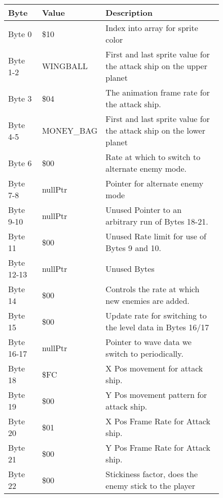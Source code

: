\begin{figure}[H]
{\begin{adjustbox}{width=12cm}
\begin{tabular}{lll}
\toprule
 Byte       & Value             & Description                                                         \\
\midrule
 Byte 0     & \$10               & Index into array for sprite color                                   \\
 Byte 1-2   & WINGBALL          & First and last sprite value for the attack ship on the upper planet \\
 Byte 3     & \$04               & The animation frame rate for the attack ship.                       \\
 Byte 4-5   & MONEY\_BAG         & First and last sprite value for the attack ship on the lower planet \\
 Byte 6     & \$00               & Rate at which to switch to alternate enemy mode.                    \\
 Byte 7-8   & nullPtr           & Pointer for alternate enemy mode                                    \\
 Byte 9-10  & nullPtr           & Unused Pointer to an arbitrary run of Bytes 18-21.                  \\
 Byte 11    & \$00               & Unused Rate limit for use of Bytes 9 and 10.                        \\
 Byte 12-13 & nullPtr           & Unused Bytes                                                        \\
 Byte 14    & \$00               & Controls the rate at which new enemies are added.                   \\
 Byte 15    & \$00               & Update rate for switching to the level data in Bytes 16/17          \\
 Byte 16-17 & nullPtr           & Pointer to wave data we switch to periodically.                     \\
 Byte 18    & \$FC               & X Pos movement for attack ship.                                     \\
 Byte 19    & \$00               & Y Pos movement pattern for attack ship.                             \\
 Byte 20    & \$01               & X Pos Frame Rate for Attack ship.                                   \\
 Byte 21    & \$00               & Y Pos Frame Rate for Attack ship.                                   \\
 Byte 22    & \$00               & Stickiness factor, does the enemy stick to the player               \\

\end{tabular}
\end{adjustbox}}
\end{figure}
